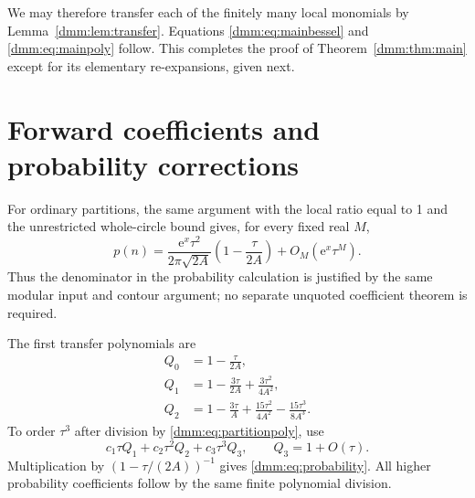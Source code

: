 \documentclass[11pt,letterpaper]{article}
\numberwithin{equation}{section}
\theoremstyle{definition}\newtheorem{definition}[theorem]{Definition}
\theoremstyle{remark}\newtheorem{remark}[theorem]{Remark}
\newcommand{\ee}{\mathrm e}
\begin{document}
We may therefore transfer each of the finitely many local monomials by Lemma~\ref{dmm:lem:transfer}. Equations \eqref{dmm:eq:mainbessel} and \eqref{dmm:eq:mainpoly} follow. This completes the proof of Theorem~\ref{dmm:thm:main} except for its elementary re-expansions, given next.

\section{Forward coefficients and probability corrections}\label{dmm:sec:corrections}
For ordinary partitions, the same argument with the local ratio equal to 1 and the unrestricted whole-circle bound gives, for every fixed real $M$,
\begin{equation}\label{dmm:eq:partitionpoly}
p(n)=\frac{\ee^x\tau^2}{2\pi\sqrt{2A}}
\left(1-\frac{\tau}{2A}\right)+O_M(\ee^x\tau^M).
\end{equation}
Thus the denominator in the probability calculation is justified by the same modular input and contour argument; no separate unquoted coefficient theorem is required.

The first transfer polynomials are
\begin{align}\label{dmm:eq:smallQ}
Q_0&=1-\frac\tau{2A},\nonumber\\
Q_1&=1-\frac{3\tau}{2A}+\frac{3\tau^2}{4A^2},\\
Q_2&=1-\frac{3\tau}{A}+\frac{15\tau^2}{4A^2}
-\frac{15\tau^3}{8A^3}.\nonumber
\end{align}
To order $\tau^3$ after division by \eqref{dmm:eq:partitionpoly}, use
\[
c_1\tau Q_1+c_2\tau^2Q_2+c_3\tau^3Q_3,
\qquad Q_3=1+O(\tau).
\]
Multiplication by $(1-\tau/(2A))^{-1}$ gives \eqref{dmm:eq:probability}. All higher probability coefficients follow by the same finite polynomial division.
\end{document}

